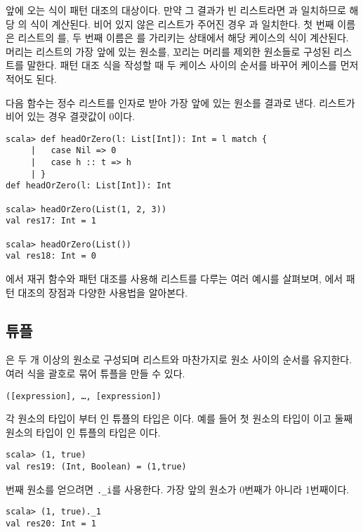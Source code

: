  앞에 오는 식이 패턴 대조의 대상이다. 만약 그 결과가 빈 리스트라면
과
일치하므로 해당 의 식이 계산된다. 비어 있지 않은 리스트가 주어진
경우 과 일치한다. 첫 번째 이름은 리스트의
를, 두 번째 이름은 를
가리키는 상태에서 해당 케이스의 식이 계산된다. 머리는
리스트의 가장 앞에 있는 원소를, 꼬리는 머리를 제외한 원소들로 구성된 리스트를
말한다. 패턴 대조 식을 작성할 때 두 케이스 사이의 순서를 바꾸어 \code{::} 케이스를 먼저
적어도 된다.

다음 함수는 정수 리스트를 인자로 받아 가장 앞에 있는 원소를 결과로 낸다.
리스트가 비어 있는 경우 결괏값이 0이다.

\begin{verbatim}
scala> def headOrZero(l: List[Int]): Int = l match {
     |   case Nil => 0
     |   case h :: t => h
     | }
def headOrZero(l: List[Int]): Int

scala> headOrZero(List(1, 2, 3))
val res17: Int = 1

scala> headOrZero(List())
val res18: Int = 0
\end{verbatim}

에서 재귀 함수와 패턴 대조를 사용해 리스트를 다루는 여러 예시를 살펴보며,
에서 패턴 대조의 장점과 다양한 사용법을 알아본다.

\subsection{튜플}

은 두 개 이상의 원소로 구성되며 리스트와 마찬가지로 원소 사이의
순서를 유지한다. 여러 식을 괄호로 묶어 튜플을 만들 수 있다.

\begin{verbatim}
([expression], …, [expression])
\end{verbatim}

각 원소의 타입이 부터 인 튜플의 타입은 이다. 예를 들어 첫 원소의
타입이 이고 둘째 원소의 타입이 인 튜플의 타입은
이다.

\begin{verbatim}
scala> (1, true)
val res19: (Int, Boolean) = (1,true)
\end{verbatim}

번째 원소를 얻으려면 \verb!._i!를 사용한다. 가장 앞의 원소가 0번째가 아니라 1번째이다.

\begin{verbatim}
scala> (1, true)._1
val res20: Int = 1
\end{verbatim}

